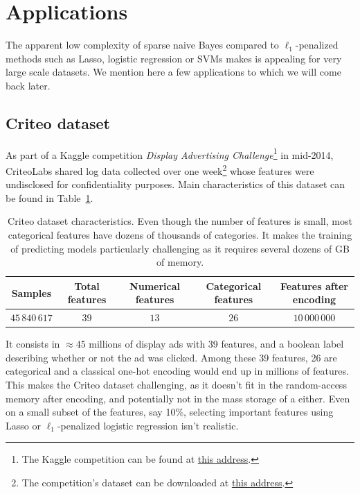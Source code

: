 \section{Applications}\label{sec:nb_app}

The apparent low complexity of sparse naive Bayes compared to $\ell_1$-penalized methods such as
Lasso, logistic regression or SVMs makes is appealing for very large scale datasets.
We mention here a few applications to which we will come back later.

\subsection{Criteo dataset}\label{subsec:snb_criteo}

As part of a Kaggle competition \emph{Display Advertising Challenge}\footnote{
    The Kaggle competition can be found at
    \href{https://www.kaggle.com/c/criteo-display-ad-challenge}{this address}.
}
in mid-2014, CriteoLabs shared log data collected over one week\footnote{
    The competition's dataset can be downloaded at
    \href{https://labs.criteo.com/2014/02/download-kaggle-display-advertising-challenge-dataset/}{this address}.
}
whose features were undisclosed for confidentiality purposes.
Main characteristics of this dataset can be found in Table~\ref{tab:criteo_dataset}.
\begin{table}[!htb]
    \centering
    \setlength{\tabcolsep}{2pt}
    {\small
    \begin{tabular}{|c|c|c|c|c|}\hline
    \textbf{Samples} & \textbf{Total features} & \textbf{Numerical features} & \textbf{Categorical features} & \textbf{Features after encoding}\\ \hline
    $45\,840\,617$ & $39$  & $13$ & $26$ & $10\,000\,000$ \\ \hline
    \end{tabular}
    }%
    \caption[short]{
        Criteo dataset characteristics.
        Even though the number of features is small,
        most categorical features have dozens of thousands of categories.
        It makes the training of predicting models particularly challenging as it requires several
        dozens of GB of memory.
    }
    \label{tab:criteo_dataset}
\end{table}
It consists in $\approx 45$ millions of display ads with 39 features,
and a boolean label describing whether or not the ad was clicked.
Among these 39 features, 26 are categorical and a classical one-hot encoding would end up in millions of features.
This makes the Criteo dataset challenging, as it doesn't fit in the random-access memory after encoding,
and potentially not in the mass storage of a either.
Even on a small subset of the features, say 10\%,
selecting important features using Lasso or $\ell_1$-penalized logistic regression isn't realistic.

